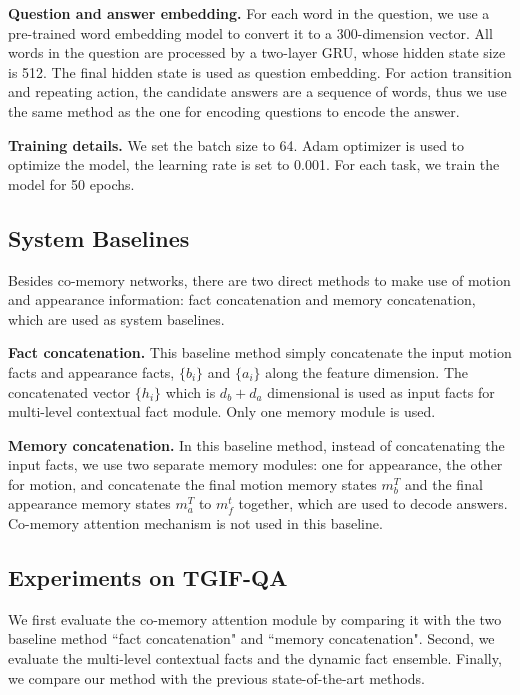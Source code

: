 \documentclass[10pt,twocolumn,letterpaper]{article}
\begin{document}
\textbf{Question and answer embedding.} For each word in the question, we use a pre-trained word embedding model \cite{pennington2014glove} to convert it to a 300-dimension vector. All words in the question are processed by a two-layer GRU, whose hidden state size is 512. The final hidden state is used as question embedding. For action transition and repeating action, the candidate answers are a sequence of words, thus we use the same method as the one for encoding questions to encode the answer.

\textbf{Training details.} We set the batch size to 64. Adam optimizer \cite{kingma2014adam} is used to optimize the model, the learning rate is set to 0.001. For each task, we train the model for 50 epochs.

\subsection{System Baselines}
Besides co-memory networks, there are two direct methods to make use of motion and appearance information: fact concatenation and memory concatenation, which are used as system baselines.

\textbf{Fact concatenation.} This baseline method simply concatenate the input motion facts and appearance facts, $\{b_{i}\}$ and $\{a_{i}\}$ along the feature dimension. The concatenated vector $\{h_{i}\}$ which is $d_b+d_a$ dimensional is used as input facts for multi-level contextual fact module. Only one memory module is used.

\textbf{Memory concatenation.} In this baseline method, instead of concatenating the input facts, we use two separate memory modules: one for appearance, the other for motion, and concatenate the final motion memory states $m_b^T$ and the final appearance memory states $m_a^T$ to $m_f^t$ together, which are used to decode answers. Co-memory attention mechanism is not used in this baseline.

\subsection{Experiments on TGIF-QA}
We first evaluate the co-memory attention module by comparing it with the two baseline method ``fact concatenation" and ``memory concatenation". Second, we evaluate the multi-level contextual facts and the dynamic fact ensemble.  Finally, we compare our method with the previous state-of-the-art methods.
\end{document}
